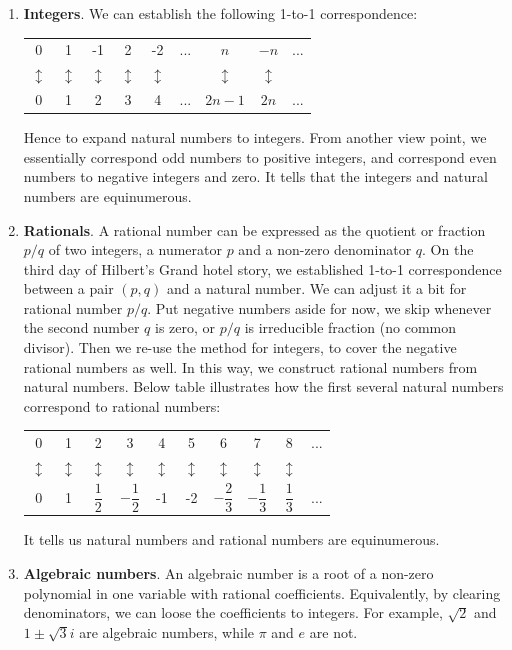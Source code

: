 \documentclass{article}
\begin{document}
\begin{enumerate}
\item \textbf{Integers}. We can establish the following 1-to-1 correspondence:

\begin{tabular}{ccccccccc}
0 & 1 & -1 & 2 & -2 & ... & $n$ & $-n$ & ... \\
$\updownarrow$ & $\updownarrow$ & $\updownarrow$ & $\updownarrow$ & $\updownarrow$ & & $\updownarrow$ & $\updownarrow$ & \\
0 & 1 &  2 & 3 &  4 & ... & $2n - 1$ & $2n$ & ... \\
\end{tabular}

Hence to expand natural numbers to integers. From another view point, we essentially correspond odd numbers to positive integers, and correspond even numbers to negative integers and zero. It tells that the integers and natural numbers are equinumerous.

\item \textbf{Rationals}. A rational number can be expressed as the quotient or fraction $p/q$ of two integers, a numerator $p$ and a non-zero denominator $q$. On the third day of Hilbert's Grand hotel story, we established 1-to-1 correspondence between a pair $(p, q)$ and a natural number. We can adjust it a bit for rational number $p/q$. Put negative numbers aside for now, we skip whenever the second number $q$ is zero, or $p/q$ is irreducible fraction (no common divisor). Then we re-use the method for integers, to cover the negative rational numbers as well. In this way, we construct rational numbers from natural numbers. Below table illustrates how the first several natural numbers correspond to rational numbers:

\begin{tabular}{cccccccccc}
0 & 1 & 2 & 3 & 4 & 5 & 6 & 7 & 8 & ... \\
$\updownarrow$ & $\updownarrow$ & $\updownarrow$ & $\updownarrow$ & $\updownarrow$ & $\updownarrow$ & $\updownarrow$ & $\updownarrow$ & $\updownarrow$ & \\
0 & 1 & $\dfrac{1}{2}$ & $-\dfrac{1}{2}$ & -1 & -2 & $-\dfrac{2}{3}$ & $-\dfrac{1}{3}$ & $\dfrac{1}{3}$ & ... \\
\end{tabular}

It tells us natural numbers and rational numbers are equinumerous.

\item \textbf{Algebraic numbers}. An algebraic number is a root of a non-zero polynomial in one variable with rational coefficients. Equivalently, by clearing denominators, we can loose the coefficients to integers. For example, $\sqrt{2}$ and $1 \pm \sqrt{3}i$ are algebraic numbers, while $\pi$ and $e$ are not.


\end{enumerate}
\end{document}
